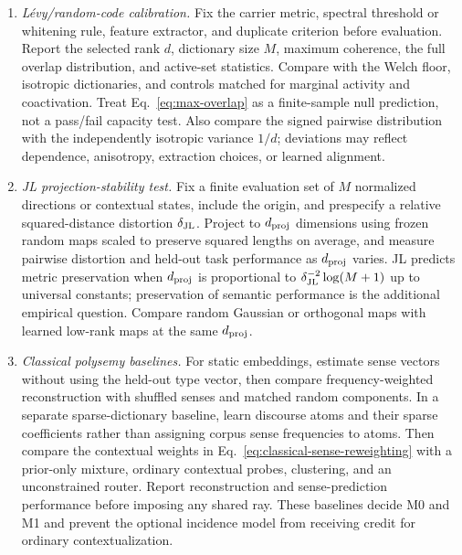\documentclass[
  aps,
  reprint,
  superscriptaddress,
  floatfix,
  nofootinbib,
  longbibliography
]{revtex4-2}
\newcommand{\Msem}{M}
\begin{document}
\begin{enumerate}
\item \emph{L\'evy/random-code calibration.}
Fix the carrier metric, spectral threshold or whitening rule, feature extractor,
and duplicate criterion before evaluation.  Report the selected rank $d$,
dictionary size $\Msem$, maximum coherence, the full overlap distribution, and
active-set statistics.  Compare with the Welch floor, isotropic dictionaries,
and controls matched for marginal activity and coactivation.  Treat
Eq.~\eqref{eq:max-overlap} as a finite-sample null prediction, not a pass/fail
capacity test.  Also compare the signed pairwise distribution with the
independently isotropic variance $1/d$; deviations may reflect dependence,
anisotropy, extraction choices, or learned alignment.

\item \emph{JL projection-stability test.}
Fix a finite evaluation set of $\Msem$ normalized directions or contextual
states, include the origin, and prespecify a relative squared-distance
distortion $\delta_{\rm JL}$.  Project to $d_{\rm proj}$ dimensions using
frozen random maps scaled to preserve squared lengths on average, and measure
pairwise distortion and held-out task
performance as $d_{\rm proj}$ varies.  JL predicts metric preservation when
$d_{\rm proj}$ is proportional to
$\delta_{\rm JL}^{-2}\log(\Msem+1)$ up to universal constants; preservation of
semantic performance is the additional empirical question.  Compare random
Gaussian or orthogonal maps with learned low-rank maps at the same
$d_{\rm proj}$.

\item \emph{Classical polysemy baselines.}
For static embeddings, estimate sense vectors without using the held-out type
vector, then compare frequency-weighted reconstruction with shuffled senses
and matched random components.  In a separate sparse-dictionary baseline,
learn discourse atoms and their sparse coefficients rather than assigning
corpus sense frequencies to atoms.  Then compare the contextual weights in
Eq.~\eqref{eq:classical-sense-reweighting} with a
prior-only mixture, ordinary contextual probes, clustering, and an unconstrained
router.  Report reconstruction and sense-prediction performance before imposing
any shared ray.  These baselines decide M0 and M1 and prevent the optional
incidence model from receiving credit for ordinary contextualization.


\end{enumerate}
\end{document}
